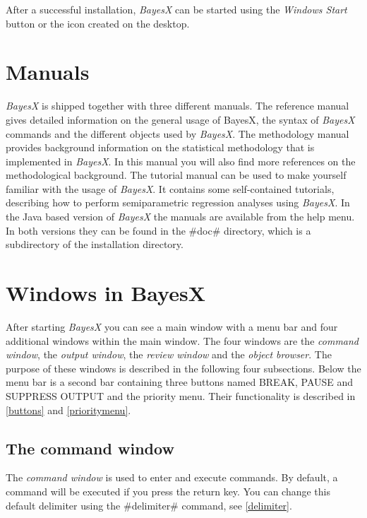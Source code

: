 After a successful installation, {\em BayesX} can be started using
the {\em Windows Start} button or the icon created on the desktop.

\section{Manuals}

{\em BayesX} is shipped together with three different manuals. The
reference manual gives detailed information on the general usage
of BayesX, the syntax of {\em BayesX} commands and the different
objects used by {\em BayesX}. The methodology manual provides
background information on the statistical methodology that is
implemented in {\em BayesX}. In this manual you will also find
more references on the methodological background. The tutorial
manual can be used to make yourself familiar with the usage of
{\em BayesX}. It contains some self-contained tutorials,
describing how to perform semiparametric regression analyses using
{\em BayesX}. In the Java based version of {\em BayesX} the
manuals are available from the help menu. In both versions they
can be found in the #doc# directory, which is a subdirectory of
the installation directory.

\section{Windows in BayesX}

After starting {\em BayesX} you can see a main window with a menu
bar and four additional windows within the main window. The four
windows are the {\em command window}, the {\em output window}, the
{\em review window} and the {\em object browser}. The purpose of
these windows is described in the following four subsections.
Below the menu bar is a second bar containing three buttons named
BREAK, PAUSE and SUPPRESS OUTPUT and the priority menu. Their
functionality is described in \autoref{buttons} and
\autoref{prioritymenu}.

\subsection{The command window}

  The {\em command window}
is used to enter and execute commands. By default, a command will
be executed if you press the return key. You can change this
default delimiter using the #delimiter# command, see
\autoref{delimiter}.

